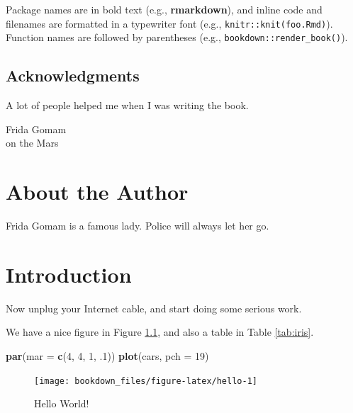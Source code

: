 \documentclass[
]{krantz}
\makeatletter
\newenvironment{Shaded}{\begin{snugshade}}{\end{snugshade}}
\newcommand{\DataTypeTok}[1]{\textcolor[rgb]{0.27,0.27,0.27}{#1}}
\newcommand{\DecValTok}[1]{\textcolor[rgb]{0.06,0.06,0.06}{#1}}
\newcommand{\FloatTok}[1]{\textcolor[rgb]{0.06,0.06,0.06}{#1}}
\newcommand{\KeywordTok}[1]{\textcolor[rgb]{0.27,0.27,0.27}{\textbf{#1}}}
\newcommand{\NormalTok}[1]{#1}
\newenvironment{kframe}{%
\medskip{}
\setlength{\fboxsep}{.8em}
 \def\at@end@of@kframe{}%
 \ifinner\ifhmode%
  \def\at@end@of@kframe{\end{minipage}}%
  \begin{minipage}{\columnwidth}%
 \fi\fi%
 \def\FrameCommand##1{\hskip\@totalleftmargin \hskip-\fboxsep
 \colorbox{shadecolor}{##1}\hskip-\fboxsep
     \hskip-\linewidth \hskip-\@totalleftmargin \hskip\columnwidth}%
 \MakeFramed {\advance\hsize-\width
   \@totalleftmargin\z@ \linewidth\hsize
   \@setminipage}}%
 {\par\unskip\endMakeFramed%
 \at@end@of@kframe}
\renewenvironment{Shaded}{\begin{kframe}}{\end{kframe}}
\makeatother
\begin{document}
Package names are in bold text (e.g., \textbf{rmarkdown}), and inline code and filenames are formatted in a typewriter font (e.g., \texttt{knitr::knit(\textquotesingle{}foo.Rmd\textquotesingle{})}). Function names are followed by parentheses (e.g., \texttt{bookdown::render\_book()}).

\hypertarget{acknowledgments}{%
\section*{Acknowledgments}\label{acknowledgments}}


A lot of people helped me when I was writing the book.

\begin{flushright}
Frida Gomam\\
on the Mars
\end{flushright}

\hypertarget{about-the-author}{%
\chapter*{About the Author}\label{about-the-author}}


Frida Gomam is a famous lady. Police will always let her go.

\mainmatter

\hypertarget{introduction}{%
\chapter{Introduction}\label{introduction}}

Now unplug your Internet cable, and start doing some serious work.

We have a nice figure in Figure \ref{fig:hello}, and also a table in Table \ref{tab:iris}.

\begin{Shaded}
\begin{Highlighting}[]
\KeywordTok{par}\NormalTok{(}\DataTypeTok{mar =} \KeywordTok{c}\NormalTok{(}\DecValTok{4}\NormalTok{, }\DecValTok{4}\NormalTok{, }\DecValTok{1}\NormalTok{, }\FloatTok{.1}\NormalTok{))}
\KeywordTok{plot}\NormalTok{(cars, }\DataTypeTok{pch =} \DecValTok{19}\NormalTok{)}
\end{Highlighting}
\end{Shaded}

\begin{figure}
\texttt{[image: bookdown\_files/figure-latex/hello-1]} \caption{Hello World!}\label{fig:hello}
\end{figure}
\end{document}
